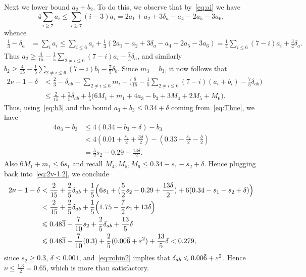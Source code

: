 Next we lower bound $a_2+b_2$. To do this, we observe that by~\eqref{eq:ai} we have
\[
4\sum_{i\ge7} a_i \le \sum_{i\ge7}(i-3)a_i = 2a_1+a_2+3\delta_a -a_4-2a_5-3a_6,
\]
whence
\begin{align*}
\frac{1}{3} -\delta_a&= \sum_{i}a_i
\le \sum_{i\le 6}a_i +\frac{1}{4}(2a_1+a_2+3\delta_a -a_4-2a_5-3a_6)
= \frac{1}{4}\sum_{i\le 6}(7-i)a_i +\frac{3}{4}\delta_a.
\end{align*}
Thus $a_2 \ge \frac{4}{15} - \frac{1}{5}\sum_{2\neq i\le 6}(7-i)a_i-\frac{7}{5}\delta_a$,
and similarly $b_2 \ge \frac{4}{15} - \frac{1}{5}\sum_{2\neq i\le 6}(7-i)b_i-\frac{7}{5}\delta_b$. Since $m_3=b_3$, it
now follows that
\begin{align}\label{eq:2v-1.2}
2\nu -1-\delta
&< \frac{2}{3}-\delta_{ab} -\sum_{2\neq i \le 6}m_i - \Big(\frac{8}{15} - \frac{1}{5}\sum_{2\neq i \le 6}(7-i)(a_i+b_i)-\frac{7}{5}\delta_{ab}\Big) \nonumber\\
& \le \frac{2}{15} +\frac{2}{5}\delta_{ab}+ \frac{1}{5}\Big(6M_1+m_1 + 4a_3-b_3 +3M_4+2M_5+ M_6\Big).
\end{align}
 Thus, using~\eqref{eq:b3} and the bound $a_3+b_3\leq 0.34+\delta$ coming from~\eqref{eq:Thue}, we have
\begin{align*}
4a_3-b_3 &\le 4(0.34-b_3+\delta)-b_3 \\
&< 4(0.01+\frac{s_2}{2}+\frac{3\delta}{2}) - (0.33-\frac{s_2}{2}-\frac{\delta}{2})\\
& = \frac{5}{2}s_2-0.29+\frac{13\delta}{2}.
\end{align*}
Also $6M_1+m_1\le 6s_1$ and recall $M_4,M_5,M_6 \le
0.34-s_1-s_2+\delta$.
Hence plugging back into~\eqref{eq:2v-1.2}, we conclude
\begin{align*}
2\nu -1-\delta
& < \frac{2}{15}+
\frac{2}{5}\delta_{ab}
+ \frac{1}{5}\Big(6s_1 + (\frac{5}{2}s_2-0.29+\frac{13\delta}{2})+6(0.34-s_1-s_2+\delta)\Big)\\
& < \frac{2}{15}+
\frac{2}{5}\delta_{ab}
+ \frac{1}{5}\Big(1.75-\frac{7}{2}s_2+13\delta\Big)\\
& \leqslant 0.48\overline{3} - \frac{7}{10}s_2 +\frac{2}{5}\delta_{ab} +\frac{13}{5}\delta \\
&\leqslant 0.48\overline{3} - \frac{7}{10}(0.3) +\frac{2}{5}(0.00\bar{6}+\varepsilon^2) +\frac{13}{5}\delta< 0.279,
\end{align*}
since $s_2\geq 0.3$, $\delta\le 0.001$, and~\eqref{eq:robin2} implies that $\delta_{ab}\leqslant 0.00\bar{6}+\varepsilon^2$.
Hence $\nu\le \frac{1.3}{2} = 0.65$, which is more than satisfactory.




